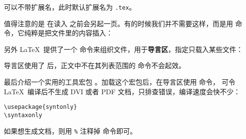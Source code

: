 可以不带扩展名，此时默认扩展名为 \texttt{.tex}。

值得注意的是  在读入  之前会另起一页。有的时候我们并不需要这样，而是用  命令，它纯粹是把文件里的内容插入：
\begin{command}
\end{command}

另外 \LaTeX\ 提供了一个  命令来组织文件，用于\textbf{导言区}，指定只载入某些文件：
\begin{command}
\end{command}

导言区使用了  后，正文中不在其列表范围的  命令不会起效。

最后介绍一个实用的工具宏包 。加载这个宏包后，在导言区使用  命令，
可令 \LaTeX\ 编译后不生成 DVI 或者 PDF 文档，只排查错误，编译速度会快不少：
\begin{verbatim}
\usepackage{syntonly}
\syntaxonly
\end{verbatim}

如果想生成文档，则用 \texttt\% 注释掉  命令即可。

\endinput
